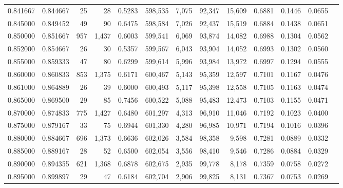 \begin{tabular}{rrrrrrrrrrrrr}
0.841667 & 0.844667 &     25 &    28 &                                     0.5283 & 598,535 &   7,075 &  92,347 &  15,609 & 0.6881 & 0.1446 & 0.0655 \\
0.845000 & 0.849452 &     49 &    90 &                                     0.6475 & 598,584 &   7,026 &  92,437 &  15,519 & 0.6884 & 0.1438 & 0.0651 \\
0.850000 & 0.851667 &    957 & 1,437 &                                     0.6003 & 599,541 &   6,069 &  93,874 &  14,082 & 0.6988 & 0.1304 & 0.0562 \\
0.852000 & 0.854667 &     26 &    30 &                                     0.5357 & 599,567 &   6,043 &  93,904 &  14,052 & 0.6993 & 0.1302 & 0.0560 \\
0.855000 & 0.859333 &     47 &    80 &                                     0.6299 & 599,614 &   5,996 &  93,984 &  13,972 & 0.6997 & 0.1294 & 0.0555 \\
0.860000 & 0.860833 &    853 & 1,375 &                                     0.6171 & 600,467 &   5,143 &  95,359 &  12,597 & 0.7101 & 0.1167 & 0.0476 \\
0.861000 & 0.864889 &     26 &    39 &                                     0.6000 & 600,493 &   5,117 &  95,398 &  12,558 & 0.7105 & 0.1163 & 0.0474 \\
0.865000 & 0.869500 &     29 &    85 &                                     0.7456 & 600,522 &   5,088 &  95,483 &  12,473 & 0.7103 & 0.1155 & 0.0471 \\
0.870000 & 0.874833 &    775 & 1,427 &                                     0.6480 & 601,297 &   4,313 &  96,910 &  11,046 & 0.7192 & 0.1023 & 0.0400 \\
0.875000 & 0.879167 &     33 &    75 &                                     0.6944 & 601,330 &   4,280 &  96,985 &  10,971 & 0.7194 & 0.1016 & 0.0396 \\
0.880000 & 0.884667 &    696 & 1,373 &                                     0.6636 & 602,026 &   3,584 &  98,358 &   9,598 & 0.7281 & 0.0889 & 0.0332 \\
0.885000 & 0.889167 &     28 &    52 &                                     0.6500 & 602,054 &   3,556 &  98,410 &   9,546 & 0.7286 & 0.0884 & 0.0329 \\
0.890000 & 0.894355 &    621 & 1,368 &                                     0.6878 & 602,675 &   2,935 &  99,778 &   8,178 & 0.7359 & 0.0758 & 0.0272 \\
0.895000 & 0.899897 &     29 &    47 &                                     0.6184 & 602,704 &   2,906 &  99,825 &   8,131 & 0.7367 & 0.0753 & 0.0269 \\

\end{tabular}

